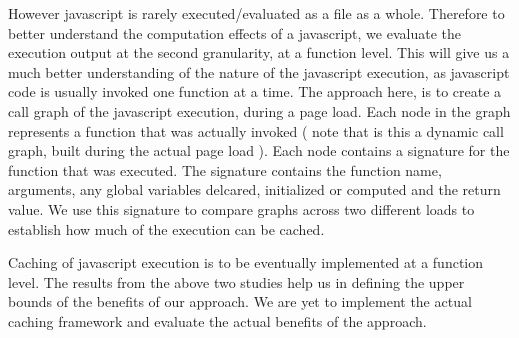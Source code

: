 However javascript is rarely executed/evaluated as a file as a whole. Therefore to better understand the computation
effects of a javascript, we evaluate the execution output at the second granularity, at a function level. 
This will give us a much better understanding of the nature of the javascript execution, as javascript code is usually
invoked one function at a time. 
The approach here, is to create a call graph of the javascript execution, during a page load. Each node
in the graph represents a function that was actually invoked ( note that is this a dynamic call graph, built
during the actual page load ). Each node contains a signature for the function that was executed. 
The signature contains the function name, arguments, any global variables delcared, initialized or computed
and the return value. We use this signature to compare graphs across two different loads to 
establish how much of the execution can be cached. 


Caching of javascript execution is to be eventually implemented at a function level. The results from the above two studies
help us in defining the upper bounds of the benefits of our approach. 
We are yet to implement the actual caching framework and evaluate the actual benefits of the approach.
